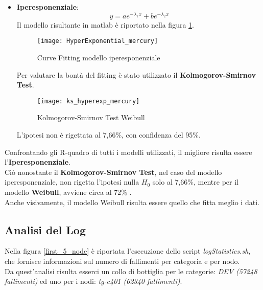 \begin{itemize}
  \clearpage

  \item \textbf{Iperesponenziale}:
  $$ y = a e^{- \lambda_1  x} +  b  e^{- \lambda_2  x} $$
  Il modello risultante in matlab è riportato nella figura \ref{HyperExponential_mercury}.\\

  \begin{figure}[!htbp]
    \centering
    \texttt{[image: HyperExponential\_mercury]}
    \caption{Curve Fitting modello iperesponenziale}
    \label{HyperExponential_mercury}
  \end{figure}

  Per valutare la bontà del fitting è stato utilizzato il \textbf{Kolmogorov-Smirnov Test}.\\

  \begin{figure}[!htbp]
    \centering
    \texttt{[image: ks\_hyperexp\_mercury]}
    \caption{Kolmogorov-Smirnov Test Weibull}
    \label{ks_hyperexp_mercury}
  \end{figure}

  L'ipotesi non è rigettata al 7,66\%, con confidenza del 95\%.\\

  \clearpage
\end{itemize}

Confrontando gli R-quadro di tutti i modelli utilizzati, il migliore risulta
essere l'\textbf{Iperesponenziale}.\\
Ciò nonostante il \textbf{Kolmogorov-Smirnov Test}, nel caso del modello
iperesponenziale, non rigetta l'ipotesi nulla $H_0$ solo al 7,66\%, mentre
per il modello \textbf{Weibull}, avviene circa al 72\% .\\
Anche visivamente, il modello Weibull risulta essere quello che fitta meglio i
dati.\\

\clearpage

\subsection{Analisi del Log}
Nella figura \ref{first_5_node} è riportata l'esecuzione dello script
\textit{logStatistics.sh}, che fornisce informazioni sul numero di fallimenti
per categoria e per nodo.\\
Da quest'analisi risulta esserci un collo di bottiglia per le categorie:
\textit{DEV (57248 fallimenti)} ed uno per i nodi: \textit{tg-c401 (62340 fallimenti)}.\\

